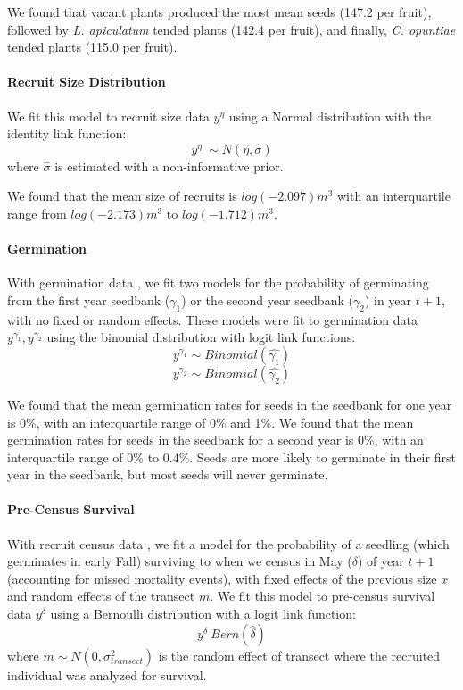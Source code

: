\documentclass[11pt]{article}
\begin{document}
We found that vacant plants produced the most mean seeds (147.2 per fruit), followed by \textit{L. apiculatum} tended plants (142.4 per fruit), and finally, \textit{C. opuntiae} tended plants (115.0 per fruit).


\paragraph{Recruit Size Distribution}
We fit this model to recruit size data $y^{\eta}$ using a Normal distribution with the identity link function: 
$$y^{\eta} ~\sim N(\hat{\eta},\hat{\sigma})$$
where $\hat{\sigma}$ is estimated with a non-informative prior. 

We found that the mean size of recruits is $log(-2.097) m^3$ with an interquartile range from $log(-2.173) m^3$ to $log(-1.712) m^3$.



\paragraph{Germination}
With germination data \cite{Miller2007}, we fit two models for the probability of germinating from the first year seedbank ($\gamma_1$) or the second year seedbank ($\gamma_2$) in year $t+1$, with no fixed or random effects.
These models were fit to germination data $y^{\gamma_1}, y^{\gamma_2}$  using the binomial distribution with logit link functions:
$$y^{\gamma_1} \sim Binomial(\hat{\gamma_1})$$
$$y^{\gamma_2} \sim Binomial(\hat{\gamma_2})$$

We found that the mean germination rates for seeds in the seedbank for one year  is 0\%, with an interquartile range of 0\% and 1\%.
We found that the mean germination rates for seeds in the seedbank for a second year is 0\%, with an interquartile range of 0\% to 0.4\%.
Seeds are more likely to germinate in their first year in the seedbank, but most seeds will never germinate. 

\paragraph{Pre-Census Survival}
With recruit census data \cite{Miller2006}, we fit a model for the probability of a seedling (which germinates in early Fall) surviving to when we census in May ($\delta$) of year $t+1$ (accounting for missed mortality events), with fixed effects of the previous size $x$ and random effects of the transect $m$.
We fit this model to pre-census survival data $y^{\delta}$ using a Bernoulli distribution with a logit link function: 
$$y^{\delta} ~ Bern(\hat{\delta})$$
where $m \sim N(0, \sigma_{transect}^2)$ is the random effect of transect where the recruited individual was analyzed for survival.
\end{document}
